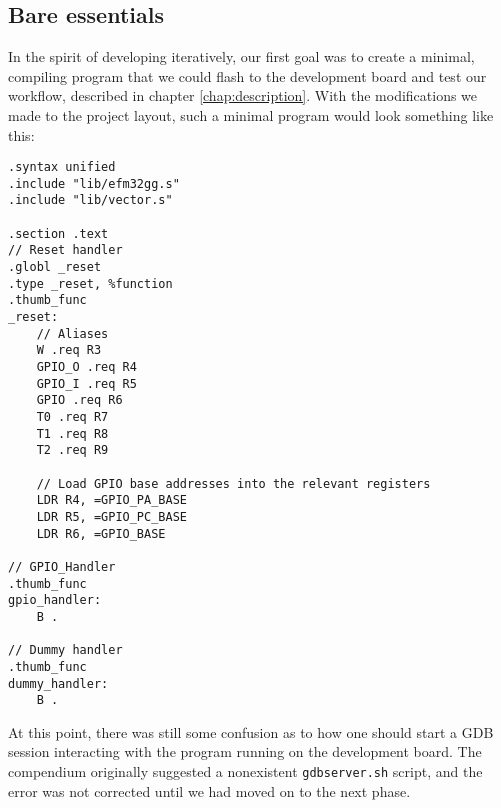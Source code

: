 \subsection{Bare essentials}
\label{sec:bare-essentials}

In the spirit of developing iteratively, our first goal was to create a minimal, compiling program that we could flash to the development board and test our workflow, described in chapter \ref{chap:description}. With the modifications we made to the project layout, such a minimal program would look something like this:

\begin{lstlisting}[label=minimal-program-ex,caption=A minimal program]
.syntax unified
.include "lib/efm32gg.s"
.include "lib/vector.s"

.section .text
// Reset handler
.globl _reset
.type _reset, %function
.thumb_func
_reset:
    // Aliases
    W .req R3
    GPIO_O .req R4
    GPIO_I .req R5
    GPIO .req R6
    T0 .req R7
    T1 .req R8
    T2 .req R9

    // Load GPIO base addresses into the relevant registers
    LDR R4, =GPIO_PA_BASE
    LDR R5, =GPIO_PC_BASE
    LDR R6, =GPIO_BASE

// GPIO_Handler
.thumb_func
gpio_handler:
    B .

// Dummy handler
.thumb_func
dummy_handler:
    B .
\end{lstlisting}

At this point, there was still some confusion as to how one should start a GDB session interacting with the program running on the development board. The compendium originally suggested a nonexistent \texttt{gdbserver.sh} script, and the error was not corrected until we had moved on to the next phase.
